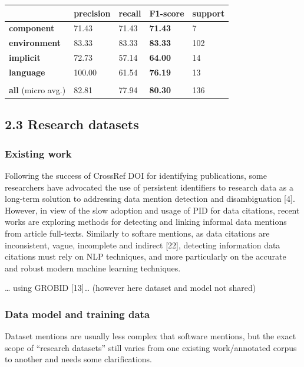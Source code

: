 \documentclass[
]{article}
\begin{document}
\begin{longtable}[]{@{}lllll@{}}
\toprule
& precision & recall & \textbf{F1-score} & support\tabularnewline
\midrule
\endhead
\textbf{component} & 71.43 & 71.43 & \textbf{71.43} & 7\tabularnewline
\textbf{environment} & 83.33 & 83.33 & \textbf{83.33} &
102\tabularnewline
\textbf{implicit} & 72.73 & 57.14 & \textbf{64.00} & 14\tabularnewline
\textbf{language} & 100.00 & 61.54 & \textbf{76.19} & 13\tabularnewline
& & & &\tabularnewline
\textbf{all} (micro avg.) & 82.81 & 77.94 & \textbf{80.30} &
136\tabularnewline
\bottomrule
\end{longtable}

\hypertarget{research-datasets}{%
\subsection{2.3 Research datasets}\label{research-datasets}}

\hypertarget{existing-work}{%
\subsubsection{Existing work}\label{existing-work}}

Following the success of CrossRef DOI for identifying publications, some
researchers have advocated the use of persistent identifiers to research
data as a long-term solution to addressing data mention detection and
disambiguation {[}4{]}. However, in view of the slow adoption and usage
of PID for data citations, recent works are exploring methods for
detecting and linking informal data mentions from article full-texts.
Similarly to softare mentions, as data citations are inconsistent,
vague, incomplete and indirect {[}22{]}, detecting information data
citations must rely on NLP techniques, and more particularly on the
accurate and robust modern machine learning techniques.

\ldots{} using GROBID {[}13{]}\ldots{} (however here dataset and model
not shared)

\hypertarget{data-model-and-training-data-1}{%
\subsubsection{Data model and training
data}\label{data-model-and-training-data-1}}

Dataset mentions are usually less complex that software mentions, but
the exact scope of ``research datasets'' still varies from one existing
work/annotated corpus to another and needs some clarifications.
\end{document}
